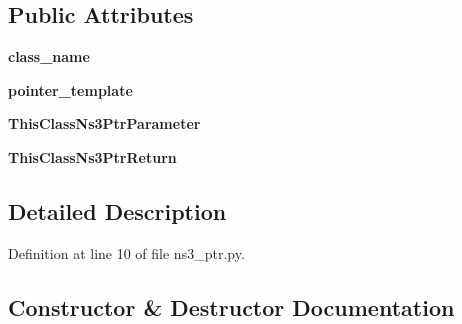 \subsection*{Public Attributes}
\begin{DoxyCompactItemize}
\item 
{\bfseries class\+\_\+name}\hypertarget{classns3__ptr_1_1Ns3PtrMemoryPolicy_a2caa408024660946907fdae880ee4b18}{}\label{classns3__ptr_1_1Ns3PtrMemoryPolicy_a2caa408024660946907fdae880ee4b18}

\item 
{\bfseries pointer\+\_\+template}\hypertarget{classns3__ptr_1_1Ns3PtrMemoryPolicy_a8389d3348d5f3c0402d0006122b75ab5}{}\label{classns3__ptr_1_1Ns3PtrMemoryPolicy_a8389d3348d5f3c0402d0006122b75ab5}

\item 
{\bfseries This\+Class\+Ns3\+Ptr\+Parameter}\hypertarget{classns3__ptr_1_1Ns3PtrMemoryPolicy_a25a459fbe069feebe7e3f328b241a42e}{}\label{classns3__ptr_1_1Ns3PtrMemoryPolicy_a25a459fbe069feebe7e3f328b241a42e}

\item 
{\bfseries This\+Class\+Ns3\+Ptr\+Return}\hypertarget{classns3__ptr_1_1Ns3PtrMemoryPolicy_ad9e22180d8075e5548c5ce7b45632740}{}\label{classns3__ptr_1_1Ns3PtrMemoryPolicy_ad9e22180d8075e5548c5ce7b45632740}

\end{DoxyCompactItemize}


\subsection{Detailed Description}


Definition at line 10 of file ns3\+\_\+ptr.\+py.



\subsection{Constructor \& Destructor Documentation}
